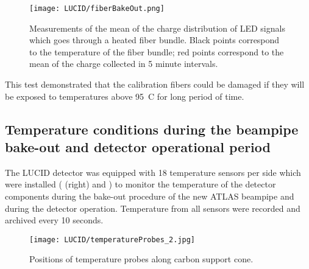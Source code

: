 \begin{figure}
\centering
\texttt{[image: LUCID/fiberBakeOut.png]}
\caption{Measurements of the mean of the charge distribution of LED signals which goes through a heated fiber bundle.
Black points correspond to the temperature of the fiber bundle; red points correspond to the mean of the charge collected in 5 minute intervals.}
\label{fig:fiberBakeOut}
\end{figure}

This test demonstrated that the calibration fibers could be damaged if they will be exposed 
to temperatures above 95\degree~C for long period of time.
% 
% 
 
\subsection{Temperature conditions during the beampipe bake-out and detector operational period}

The LUCID detector was equipped with 18 temperature sensors per side which were installed ( (right) 
and )
to monitor the temperature of the detector components during the bake-out procedure of the new ATLAS beampipe and during the detector operation.
Temperature from all sensors were recorded and archived every 10 seconds.

\begin{figure}
\centering
\texttt{[image: LUCID/temperatureProbes\_2.jpg]}
\caption{Positions of temperature probes along carbon support cone.}
\label{fig:temperatureProbes_VJCone}
\end{figure}

